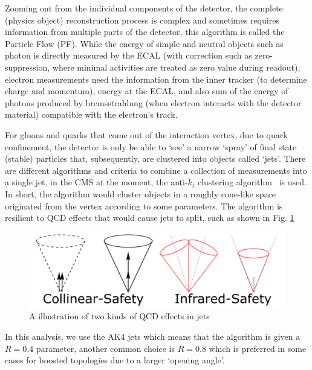Zooming out from the individual components of the detector, the complete (physics object) reconstruction
process is complex and sometimes requires information from multiple parts of the detector, this
algorithm is called the Particle Flow (PF)\cite{particle_flow}. While the energy of simple and neutral 
objects such as photon is directly measured by the ECAL (with correction such as zero-suppression, where minimal
activities are treated as zero value during readout), electron measurements
need the information from the inner tracker (to determine charge and momentum), energy at the ECAL, and
also sum of the energy of photons produced by bremsstrahlung (when electron interacts with the 
detector material) compatible with the electron's track.

For gluons and quarks that come out of the interaction vertex, due to quark confinement, the detector 
is only be able to `see' a narrow `spray' of final state (stable) particles that, subsequently, 
are clustered into objects called `jets'.
There are different algorithms and criteria to combine a collection of measurements into a single jet,
in the CMS at the moment, the anti-$k_t$ clustering algorithm~\cite{anti_k,fastjet} is used. In short, the algorithm would cluster objects
in a roughly cone-like space originated from the vertex according to some parameters.
The algorithm is resilient to QCD effects that would cause jets to split, such as shown in Fig.
\ref{fig:jet_split}

\begin{figure}[htb]
\begin{center}
\includegraphics[width=.85\linewidth]{fig/jet_split.png}
\end{center}
\caption{A illustration of two kinds of QCD effects in jets\protect\footnotemark}
\label{fig:jet_split}
\end{figure}

In this analysis, we use the AK4 jets which means that the algorithm is given a $R=0.4$ parameter, another
common choice is $R=0.8$ which is preferred in some cases for boosted topologies due to a larger `opening
angle'.

